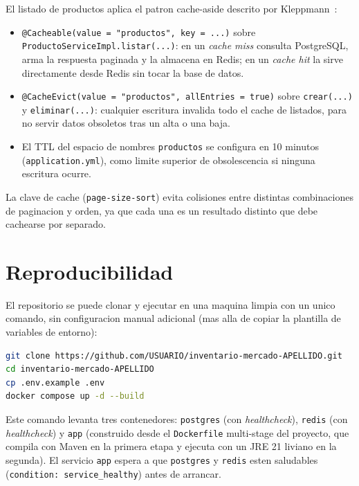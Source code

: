 \documentclass[11pt,a4paper]{article}
\begin{document}
El listado de productos aplica el patron cache-aside descrito por
Kleppmann~\cite{kleppmann2017}:

\begin{itemize}
    \item \texttt{@Cacheable(value = "productos", key = ...)} sobre
          \texttt{ProductoServiceImpl.listar(...)}: en un \emph{cache miss}
          consulta PostgreSQL, arma la respuesta paginada y la almacena en
          Redis; en un \emph{cache hit} la sirve directamente desde Redis
          sin tocar la base de datos.
    \item \texttt{@CacheEvict(value = "productos", allEntries = true)}
          sobre \texttt{crear(...)} y \texttt{eliminar(...)}: cualquier
          escritura invalida todo el cache de listados, para no servir
          datos obsoletos tras un alta o una baja.
    \item El TTL del espacio de nombres \texttt{productos} se configura en
          10 minutos (\texttt{application.yml}), como limite superior de
          obsolescencia si ninguna escritura ocurre.
\end{itemize}

La clave de cache (\texttt{page-size-sort}) evita colisiones entre
distintas combinaciones de paginacion y orden, ya que cada una es un
resultado distinto que debe cachearse por separado.

\section{Reproducibilidad}

El repositorio se puede clonar y ejecutar en una maquina limpia con un
unico comando, sin configuracion manual adicional (mas alla de copiar la
plantilla de variables de entorno):

\begin{lstlisting}[language=bash]
git clone https://github.com/USUARIO/inventario-mercado-APELLIDO.git
cd inventario-mercado-APELLIDO
cp .env.example .env
docker compose up -d --build
\end{lstlisting}

Este comando levanta tres contenedores: \texttt{postgres} (con
\emph{healthcheck}), \texttt{redis} (con \emph{healthcheck}) y \texttt{app}
(construido desde el \texttt{Dockerfile} multi-stage del proyecto, que
compila con Maven en la primera etapa y ejecuta con un JRE 21 liviano en
la segunda). El servicio \texttt{app} espera a que \texttt{postgres} y
\texttt{redis} esten saludables (\texttt{condition: service\_healthy})
antes de arrancar.
\end{document}
